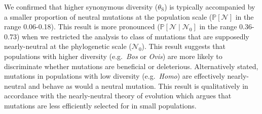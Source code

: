 \documentclass[12pt]{article}
\newcommand{\proba}{\mathbb{P}}
\newcommand{\SphyNeu}{\mathcal{N}_0}
\newcommand{\given}{\mid}
\newcommand{\SpopNeu}{\mathcal{N}}
\newcommand{\thetaSyn}{\theta_{\text{S}}}
\begin{document}
    We confirmed that higher synonymous diversity ($\thetaSyn$) is typically accompanied by a smaller proportion of neutral mutations at the population scale ($\proba [ \SpopNeu ]$ in the range 0.06-0.18).
    This result is more pronounced ($\proba [ \SpopNeu \given \SphyNeu ]$ in the range 0.36-0.73) when we restricted the analysis to class of mutations that are supposedly nearly-neutral at the phylogenetic scale ($\SphyNeu$).
    This result suggests that populations with higher diversity (e.g.~\textit{Bos} or \textit{Ovis}) are more likely to discriminate whether mutations are beneficial or deleterious.
    Alternatively stated, mutations in populations with low diversity (e.g.~\textit{Homo}) are effectively nearly-neutral and behave as would a neutral mutation.
    This result is qualitatively in accordance with the nearly-neutral theory of evolution which argues that mutations are less efficiently selected for in small populations.
\end{document}
